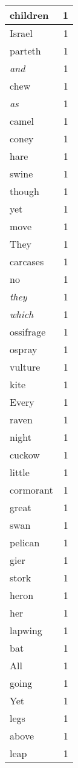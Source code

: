 \begin{center}
\begin{longtable}{l|r}
children & 1 \\ \hline
Israel & 1 \\ \hline
parteth & 1 \\ \hline
\emph{and} & 1 \\ \hline
chew & 1 \\ \hline
\emph{as} & 1 \\ \hline
camel & 1 \\ \hline
coney & 1 \\ \hline
hare & 1 \\ \hline
swine & 1 \\ \hline
though & 1 \\ \hline
yet & 1 \\ \hline
move & 1 \\ \hline
They & 1 \\ \hline
carcases & 1 \\ \hline
no & 1 \\ \hline
\emph{they} & 1 \\ \hline
\emph{which} & 1 \\ \hline
ossifrage & 1 \\ \hline
ospray & 1 \\ \hline
vulture & 1 \\ \hline
kite & 1 \\ \hline
Every & 1 \\ \hline
raven & 1 \\ \hline
night & 1 \\ \hline
cuckow & 1 \\ \hline
little & 1 \\ \hline
cormorant & 1 \\ \hline
great & 1 \\ \hline
swan & 1 \\ \hline
pelican & 1 \\ \hline
gier & 1 \\ \hline
stork & 1 \\ \hline
heron & 1 \\ \hline
her & 1 \\ \hline
lapwing & 1 \\ \hline
bat & 1 \\ \hline
All & 1 \\ \hline
going & 1 \\ \hline
Yet & 1 \\ \hline
legs & 1 \\ \hline
above & 1 \\ \hline
leap & 1 \\ \hline

\end{longtable}
\end{center}
